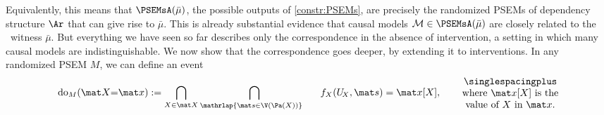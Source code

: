 Equivalently, this means that $\PSEMsA(\bar\mu)$, the possible outputs of \cref{constr:PSEMs}, are precisely the randomized PSEMs 
of dependency structure $\Ar$ that can give rise to $\bar\mu$. 
This is already substantial evidence that causal models $\mathcal M \in \PSEMsA(\bar\mu)$ are closely related to the \scibility\ witness 
$\bar\mu$. But everything we have seen so far describes only the
 correspondence in the absence of intervention, a setting in which many causal models are indistinguishable.  
We now show that the correspondence goes deeper, by extending it to interventions. 
In any randomized PSEM $M$, we can define an event 
\begin{equation}
    \mathrm{do}_{M}(\mat X{=}\mat x) := 
        \bigcap_{X \in \mat X} \bigcap_{\mathrlap{\mat s \in \V(\Pa(X))}~~}~~~f_X(U_{\!{X}}, \mat s) = \mat x[X],
    \qquad\parbox{3.5cm}{\centering\singlespacingplus
    where $\mat x[X]$ is the value of $X$ in $\mat x$.
    }
\end{equation}
